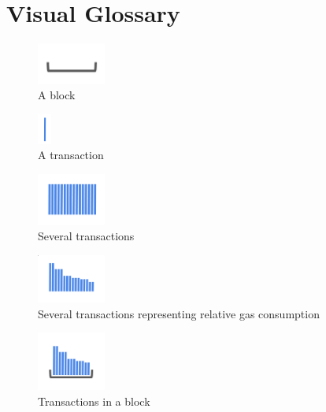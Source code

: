 \documentclass[11pt]{article}
\theoremstyle{plain}
\begin{document}
\pagebreak
\section{\normalsize{Visual Glossary}}

\begin{figure}[tph]
\centering
\includegraphics[width=0.2\textwidth]{vis_block.png}
\caption{A block}
\label{fig:block}
\end{figure}

\begin{figure}[tph]
\centering
\includegraphics[height=1cm]{vis_tx.png}
\caption{A transaction}
\label{fig:tx}
\end{figure}

\begin{figure}[tph]
\centering
\includegraphics[width=0.2\textwidth]{vis_tx_set.png}
\caption{Several transactions}
\label{fig:txs}
\end{figure}

\begin{figure}[tph]
\centering
\includegraphics[width=0.2\textwidth]{vis_tx_set_sized.png}
\caption{Several transactions representing relative gas consumption}
\label{fig:txsgas}
\end{figure}

\begin{figure}[tph]
\centering
\includegraphics[width=0.2\textwidth]{vis_blocktxs.png}
\caption{Transactions in a block}
\label{fig:blocktxs}
\end{figure}
\end{document}
